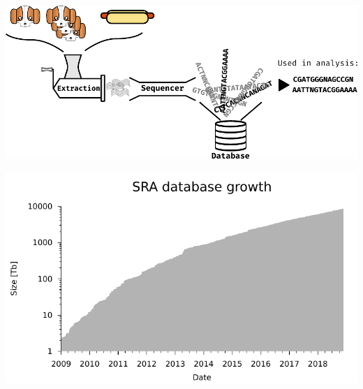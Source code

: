 \documentclass[final, a0paper, portrait]{baposter}
\begin{document}
\begin{poster}
{
  \begin{minipage}{0.33\linewidth}
    \includegraphics[width=\linewidth]{figs/sampling.pdf}
  \end{minipage}
  \begin{minipage}{0.33\linewidth}
    \includegraphics[width=\linewidth]{figs/sra_growth.pdf}
  \end{minipage}
  \begin{minipage}{0.33\linewidth}
    \resizebox{\linewidth}{!}{}
  \end{minipage}

}
\end{poster}
\end{document}
